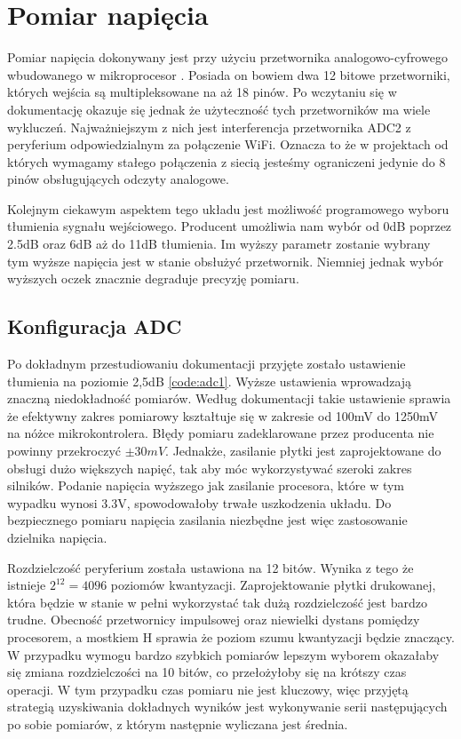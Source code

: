     \section{Pomiar napięcia}
         Pomiar napięcia dokonywany jest przy użyciu przetwornika analogowo-cyfrowego wbudowanego w mikroprocesor \cite{esp32}. Posiada on bowiem dwa 12 bitowe przetworniki, których wejścia są multipleksowane na aż 18 pinów. Po wczytaniu się w dokumentację okazuje się jednak że użyteczność tych przetworników ma wiele wykluczeń. Najważniejszym z nich jest interferencja przetwornika ADC2 z peryferium odpowiedzialnym za połączenie WiFi. Oznacza to że w projektach od których wymagamy stałego połączenia z siecią jesteśmy ograniczeni jedynie do 8 pinów obsługujących odczyty analogowe. 
         
         Kolejnym ciekawym aspektem tego układu jest możliwość programowego wyboru tłumienia sygnału wejściowego. Producent umożliwia nam wybór od 0dB poprzez 2.5dB oraz 6dB aż do 11dB tłumienia. Im wyższy parametr zostanie wybrany tym wyższe napięcia jest w stanie obsłużyć przetwornik. Niemniej jednak wybór wyższych oczek znacznie degraduje precyzję pomiaru.
     
     
    \subsection{Konfiguracja ADC}
        Po dokładnym przestudiowaniu dokumentacji przyjęte zostało ustawienie tłumienia na poziomie 2,5dB \ref{code:adc1}. Wyższe ustawienia wprowadzają znaczną niedokładność pomiarów. Według dokumentacji \cite{esp32} takie ustawienie sprawia że efektywny zakres pomiarowy kształtuje się w zakresie od 100mV do 1250mV na nóżce mikrokontrolera. Błędy pomiaru zadeklarowane przez producenta nie powinny przekroczyć $ \pm 30 mV$. Jednakże, zasilanie płytki jest zaprojektowane do obsługi dużo większych napięć, tak aby móc wykorzystywać szeroki zakres silników. Podanie napięcia wyższego jak zasilanie procesora, które w tym wypadku wynosi 3.3V, spowodowałoby trwałe uszkodzenia układu. Do bezpiecznego pomiaru napięcia zasilania niezbędne jest więc zastosowanie dzielnika napięcia. 
        
        Rozdzielczość peryferium została ustawiona na 12 bitów. Wynika z tego że istnieje $2^{12} = 4096$ poziomów kwantyzacji. Zaprojektowanie płytki drukowanej, która będzie w stanie w pełni wykorzystać tak dużą rozdzielczość jest bardzo trudne. Obecność przetwornicy impulsowej oraz niewielki dystans pomiędzy procesorem, a mostkiem H sprawia że poziom szumu kwantyzacji będzie znaczący. W przypadku wymogu bardzo szybkich pomiarów lepszym wyborem okazałaby się zmiana rozdzielczości na 10 bitów, co przełożyłoby się na krótszy czas operacji. W tym przypadku czas pomiaru nie jest kluczowy, więc przyjętą strategią uzyskiwania dokładnych wyników jest wykonywanie serii następujących po sobie pomiarów, z którym następnie wyliczana jest średnia.
        
